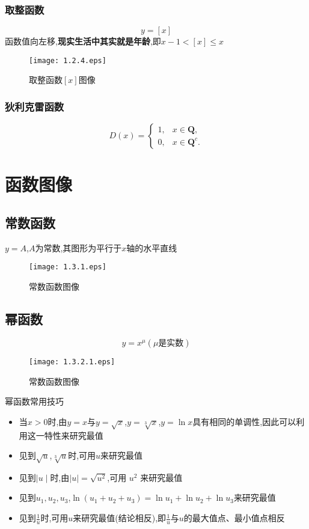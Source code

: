 \documentclass[12pt, a4paper, oneside, UTF8]{ctexbook}  %
\begin{document}
\subsubsection{取整函数}
$$
    y=[x]
$$
函数值向左移,\textbf{现实生活中其实就是年龄},即$x-1<[x] \leq x$
\begin{figure}[H]
    \centering \texttt{[image: 1.2.4.eps]} \caption{取整函数$[x]$图像}
\end{figure}

\subsubsection{狄利克雷函数}
$$
    D\left(x\right)=\left\{\begin{matrix}{1,}&x\in\mathbf{Q},\\{0,}&x\in\mathbf{Q}^{c}.\end{matrix}\right.
$$

\section{函数图像}
\subsection{常数函数}
$y=A$,$A$为常数,其图形为平行于$x$轴的水平直线
\begin{figure}[H]
    \centering \texttt{[image: 1.3.1.eps]} \caption{常数函数图像}
\end{figure}
\subsection{幂函数}
$$
    y=x^{\mu}(\mu \text{是实数})
$$
\begin{figure}[H]
    \centering \texttt{[image: 1.3.2.1.eps]} \caption{常数函数图像}
\end{figure}
\begin{criterion}{幂函数常用技巧}{}
    \begin{itemize}
        \item 当$x>0$时,由$y=x$与$y=\sqrt{x}$,$y=\sqrt[3]{x}$,$y=\ln x$具有相同的单调性,因此可以利用这一特性来研究最值
        \item 见到$\sqrt{u}$,$\sqrt[3]{u}$时,可用$u$来研究最值
        \item 见到$\mid u\mid$时,由$\mid u\mid=\sqrt{u^2}$,可用 $u^2$ 来研究最值
        \item 见到$u_1,u_2,u_3$,$\ln (u_1+u_2+u_3)=\ln u_{1}+\ln u_{2}+\ln u_{3}$来研究最值
        \item 见到$\frac{1}{u}$时,可用$u$来研究最值(结论相反),即$\frac{1}{u}$与$u$的最大值点、最小值点相反
    \end{itemize}
\end{criterion}
\end{document}
